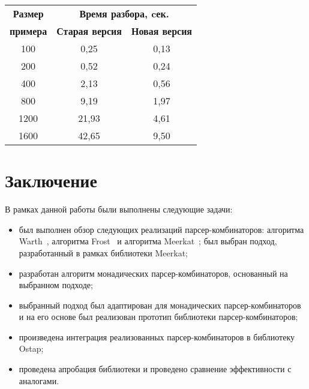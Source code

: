 \begin{table}[htbp]
\begin{center}
\begin{tabular}{|c|c|c|}
\hline
\textbf{Размер} & \multicolumn{2}{|c|}{\textbf{Время разбора, cек.}} \\
\cline{2-3}
\textbf{примера} & \textbf{Старая версия} & \textbf{Новая версия} \\
\hline
100& 0,25& 0,13 \\
\hline
200& 0,52& 0,24 \\
\hline
400& 2,13& 0,56 \\
\hline
800& 9,19& 1,97 \\
\hline
1200& 21,93& 4,61 \\
\hline
1600& 42,65& 9,50 \\
\hline
\end{tabular}
\vskip3mm
\label{tab1}
\end{center}\vspace{-10mm}
\end{table}


\section*{Заключение}

В рамках данной работы были выполнены следующие задачи:
\begin{itemize}
    \item был выполнен обзор следующих реализаций парсер-комбинаторов: алгоритма Warth~\cite{warth}, алгоритма Frost~\cite{frost} и алгоритма Meerkat~\cite{meerkat}; был выбран подход, разработанный в рамках библиотеки Meerkat;
    \item разработан алгоритм монадических парсер-комбинаторов, основанный на выбранном подходе;
    \item выбранный подход был адаптирован для монадических парсер-комбинаторов и на его основе был реализован прототип библиотеки парсер-комбинаторов;
    \item произведена интеграция реализованных парсер-комбинаторов в библиотеку Ostap;
    \item проведена апробация библиотеки и проведено сравнение эффективности с аналогами.
\end{itemize}

